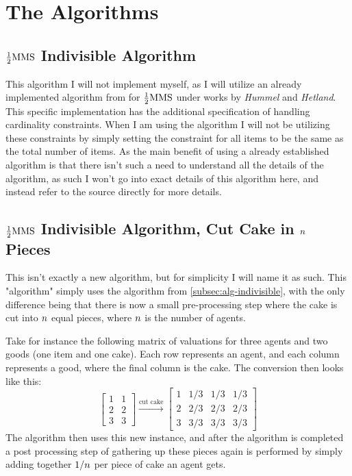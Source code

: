 \section{The Algorithms}\label{sec:the-algorithms}

\subsection{\texorpdfstring{$\frac{1}{2}\text{MMS}$}{1/2MMS} Indivisible Algorithm}\label{subsec:alg-indivisible}

This algorithm I will not implement myself, as I will utilize an already implemented algorithm from \cite{Allocations} for $\frac{1}{2}\text{MMS}$ under works by \emph{Hummel} and \emph{Hetland}. This specific implementation has the additional specification of handling cardinality constraints. When I am using the algorithm I will not be utilizing these constraints by simply setting the constraint for all items to be the same as the total number of items. As the main benefit of using a already established algorithm is that there isn't such a need to understand all the details of the algorithm, as such I won't go into exact details of this algorithm here, and instead refer to the source directly for more details\cite{Allocations}.




\subsection{\texorpdfstring{$\frac{1}{2}\text{MMS}$}{1/2MMS} Indivisible Algorithm, Cut Cake in \texorpdfstring{$n$}{n} Pieces}\label{subsec:alg-cut-cake}

This isn't exactly a new algorithm, but for simplicity I will name it as such. This "algorithm" simply uses the algorithm from \autoref{subsec:alg-indivisible}, with the only difference being that there is now a small pre-processing step where the cake is cut into $n$ equal pieces, where $n$ is the number of agents. 

Take for instance the following matrix of valuations for three agents and two goods (one item and one cake). Each row represents an agent, and each column represents a good, where the final column is the cake. The conversion then looks like this:
$$
    \begin{bmatrix}
        1 & 1 \\
        2 & 2 \\
        3 & 3
    \end{bmatrix}
    \overset{\text{cut cake}}{\rightarrow}
    \begin{bmatrix}
        1 & 1/3 & 1/3 & 1/3 \\
        2 & 2/3 & 2/3 & 2/3 \\
        3 & 3/3 & 3/3 & 3/3
    \end{bmatrix}
$$
The algorithm then uses this new instance, and after the algorithm is completed a post processing step of gathering up these pieces again is performed by simply adding together $1/n$ per piece of cake an agent gets.

